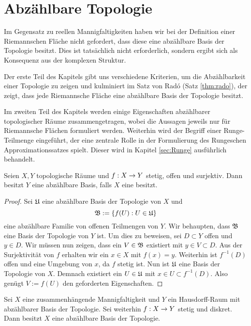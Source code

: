 
\section{Abzählbare Topologie}
\label{sec:Topologie}

Im Gegensatz zu reellen Mannigfaltigkeiten haben wir bei der
Definition einer Riemannschen Fläche nicht gefordert, dass diese eine
abzählbare Basis der Topologie besitzt. Dies ist tatsächlich nicht
erforderlich, sondern ergibt sich als Konsequenz aus der komplexen
Struktur.

Der erste Teil des Kapitels gibt uns verschiedene Kriterien, um die
Abzählbarkeit einer Topologie zu zeigen und kulminiert im Satz von
Rad\'o (Satz \ref{thm:rado}), der zeigt, dass jede Riemannsche Fläche
eine abzählbare Basis der Topologie besitzt.

Im zweiten Teil des Kapitels werden einige Eigenschaften abzählbarer
topologischer Räume zusammengetragen, wobei die Aussagen jeweils nur
für Riemannsche Flächen formuliert werden. Weiterhin wird der Begriff
einer Runge-Teilmenge eingeführt, der eine zentrale Rolle in der
Formulierung des Rungeschen Approximationssatzes spielt. Dieser wird
in Kapitel \ref{sec:Runge} ausführlich behandelt.

\begin{lemma}
  \label{lemma:surj-offen-top}
  Seien $X,Y$ topologische Räume und $f: X \rightarrow Y$ stetig, offen und
  surjektiv. Dann besitzt $Y$ eine abzählbare Basis, falls $X$ eine
  besitzt.
\end{lemma}

\begin{proof}
  Sei $\mathfrak{U}$ eine abzählbare Basis der Topologie von $X$ und
  \[
  \mathfrak{B} := \{ f(U) : U \in \mathfrak{U} \}
  \]
  eine abzählbare Familie von offenen Teilmengen von $Y$. Wir
  behaupten, dass $\mathfrak{B}$ eine Basis der Topologie von $Y$ ist. Um dies
  zu beweisen, sei $D \subset Y$ offen und $y \in D$. Wir
  müssen nun zeigen, dass ein $V \in \mathfrak{B}$ existiert mit $y \in V
  \subset D$. Aus der Surjektivität von $f$ erhalten wir ein $x \in X$ mit $f(x) =
  y$. Weiterhin ist $f^{-1}(D)$ offen und eine Umgebung von $x$, da
  $f$ stetig ist. Nun ist $\mathfrak{U}$ eine Basis der Topologie von
  $X$. Demnach existiert ein $U \in \mathfrak{U}$ mit $x \in U \subset f^{-1}(D)$. Also
  genügt $V:=f(U)$ den geforderten Eigenschaften.
\end{proof}

\begin{lemma}
  \label{lemma:poincare-volterra}
  Sei $X$ eine zusammenhängende Mannigfaltigkeit und $Y$ ein
  Hausdorff-Raum mit abzählbarer Basis der Topologie. Sei weiterhin
  $f: X \rightarrow Y$ stetig und diskret. \\
  Dann besitzt $X$ eine abzählbare Basis der Topologie.
\end{lemma}

